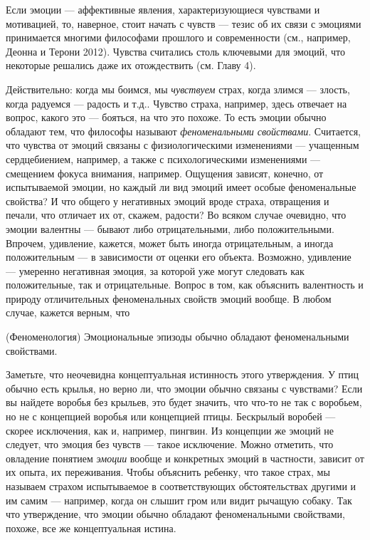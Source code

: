 \documentclass[11pt]{book}
\begin{document}
Если эмоции --- аффективные явления, характеризующиеся чувствами и мотивацией, то, наверное, стоит начать с чувств --- тезис об их связи с эмоциями принимается многими философами прошлого и современности (см., например, Деонна и Терони 2012). Чувства считались столь ключевыми для эмоций, что некоторые решались даже их отождествить (см. Главу 4).

Действительно: когда мы боимся, мы \textit{чувствуем} страх, когда злимся --- злость, когда радуемся --- радость и т.д.. Чувство страха, например, здесь отвечает на вопрос, какого это --- бояться, на что это похоже. То есть эмоции обычно обладают тем, что философы называют \textit{феноменальными свойствами}. Считается, что чувства от эмоций связаны с физиологическими изменениями --- учащенным сердцебиением, например, а также с психологическими изменениями --- смещением фокуса внимания, например. Ощущения зависят, конечно, от испытываемой эмоции, но каждый ли вид эмоций имеет особые феноменальные свойства? И что общего у негативных эмоций вроде страха, отвращения и печали, что отличает их от, скажем, радости? Во всяком случае очевидно, что эмоции валентны --- бывают либо отрицательными, либо положительными. Впрочем, удивление, кажется, может быть иногда отрицательным, а иногда положительным --- в зависимости от оценки его объекта. Возможно, удивление --- умеренно негативная эмоция, за которой уже могут следовать как положительные, так и отрицательные. Вопрос в том, как объяснить валентность и природу отличительных феноменальных свойств эмоций вообще. В любом случае, кажется верным, что

\smallskip

(Феноменология) Эмоциональные эпизоды обычно обладают феноменальными свойствами.

\smallskip

Заметьте, что неочевидна концептуальная истинность этого утверждения. У птиц обычно есть крылья, но верно ли, что эмоции обычно связаны с чувствами? Если вы найдете воробья без крыльев, это будет значить, что что-то не так с воробьем, но не с концепцией воробья или концепцией птицы. Бескрылый воробей --- скорее исключения, как и, например, пингвин. Из концепции же эмоций не следует, что эмоция без чувств --- такое исключение. Можно отметить, что овладение понятием \textit{эмоции} вообще и конкретных эмоций в частности, зависит от их опыта, их переживания. Чтобы объяснить ребенку, что такое страх, мы называем страхом испытываемое в соответствующих обстоятельствах другими и им самим --- например, когда он слышит гром или видит рычащую собаку. Так что утверждение, что эмоции обычно обладают феноменальными свойствами, похоже, все же концептуальная истина.
\end{document}
